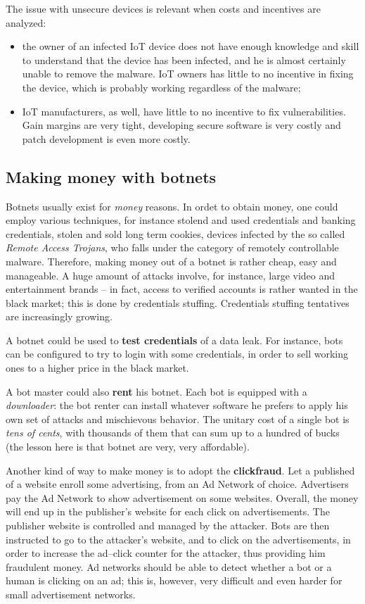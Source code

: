 \documentclass[10pt]{extbook}
\begin{document}
The issue with unsecure devices is relevant when costs and incentives are
analyzed:
\begin{itemize}
    \item the owner of an infected IoT device does not have enough knowledge
        and skill to understand that the device has been infected, and he is
        almost certainly unable to remove the malware. IoT owners has little to
        no incentive in fixing the device, which is probably working regardless
        of the malware;
    \item IoT manufacturers, as well, have little to no incentive to fix
        vulnerabilities. Gain margins are very tight, developing secure
        software is very costly and patch development is even more costly.
\end{itemize}


\subsection{Making money with botnets}

Botnets usually exist for \emph{money} reasons. In ordet to obtain money, one
could employ various techniques, for instance stolend and used credentials and
banking credentials, stolen and sold long term cookies, devices infected by the
so called \emph{Remote Access Trojans}, who falls under the category of
remotely controllable malware. Therefore, making money out of a botnet is
rather cheap, easy and manageable. A huge amount of attacks involve, for
instance, large video and entertainment brands -- in fact, access to verified
accounts is rather wanted in the black market; this is done by credentials
stuffing. Credentials stuffing tentatives are increasingly growing. 

A botnet could be used to \textbf{test credentials} of a data leak. For instance,
bots can be configured to try to login with some credentials, in order to sell
working ones to a higher price in the black market.

A bot master could also \textbf{rent} his botnet. Each bot is equipped with a
\emph{downloader}: the bot renter can install whatever software he prefers to
apply his own set of attacks and mischievous behavior. The unitary cost of a
single bot is \emph{tens of cents}, with thousands of them that can sum up to a
hundred of bucks (the lesson here is that botnet are very, very affordable).

Another kind of way to make money is to adopt the \textbf{clickfraud}. Let a
published of a website enroll some advertising, from an Ad Network of choice.
Advertisers pay the Ad Network to show advertisement on some websites. Overall,
the money will end up in the publisher's website for each click on
advertisements. The publisher website is controlled and managed by the
attacker. Bots are then instructed to go to the attacker's website, and to
click on the advertisements, in order to increase the ad--click counter for the
attacker, thus providing him fraudulent money. Ad networks should be able to
detect whether a bot or a human is clicking on an ad; this is, however, very
difficult and even harder for small advertisement networks.
\end{document}
